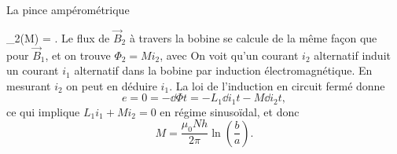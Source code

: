 \begin{exo}[PC][2][TD]{La pince ampérométrique}
\begin{quest}
{{		_2(M) = \et.
	}
Le flux de $\Vec{B}_2$ à travers la bobine se calcule de la même façon que pour $\Vec{B}_1$, et on trouve $\Phi_2 = M i_2$, avec
On voit qu'un courant $i_2$ alternatif induit un courant $i_1$ alternatif dans la bobine par induction électromagnétique. En mesurant $i_2$ on peut en déduire $i_1$. La loi de l'induction en circuit fermé donne 
$$
e = 0 = -\dd{\Phi}{t} = -L_1 \dd{i_1}{t} - M \dd{i_2}{t},
$$
ce qui implique $L_1i_1+Mi_2 = 0$ en régime sinusoïdal, et donc 
\begin{equation*}
	M =  \frac{\mu_0 N h}{2 \pi} \ln\left(\frac{b}{a} \right).
\end{equation*}
}
%
\end{quest}
\end{exo}


